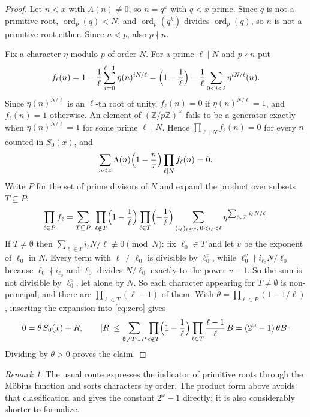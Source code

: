 \documentclass[11pt]{amsart}
\theoremstyle{definition}
\theoremstyle{remark}
\newtheorem{remark}[theorem]{Remark}
\newcommand{\Lam}{\Lambda}
\newcommand{\ord}{\operatorname{ord}}
\begin{document}
\begin{proof}
Let $n<x$ with $\Lam(n)\ne 0$, so $n=q^k$ with $q<x$ prime. Since $q$ is not a primitive root, $\ord_p(q)<N$, and $\ord_p(q^k)$ divides $\ord_p(q)$, so $n$ is not a primitive root either. Since $n<p$, also $p\nmid n$.

Fix a character $\eta$ modulo $p$ of order $N$. For a prime $\ell\mid N$ and $p\nmid n$ put
\[
f_\ell(n)=1-\frac1\ell\sum_{i=0}^{\ell-1}\eta(n)^{iN/\ell}=\Bigl(1-\frac1\ell\Bigr)-\frac1\ell\sum_{0<i<\ell}\eta^{iN/\ell}(n).
\]
Since $\eta(n)^{N/\ell}$ is an $\ell$-th root of unity, $f_\ell(n)=0$ if $\eta(n)^{N/\ell}=1$, and $f_\ell(n)=1$ otherwise. An element of $(\mathbb{Z}/p\mathbb{Z})^\times$ fails to be a generator exactly when $\eta(n)^{N/\ell}=1$ for some prime $\ell\mid N$. Hence $\prod_{\ell\mid N}f_\ell(n)=0$ for every $n$ counted in $S_0(x)$, and
\begin{equation}\label{eq:zero}
\sum_{n<x}\Lam(n)\Bigl(1-\frac nx\Bigr)\prod_{\ell\mid N}f_\ell(n)=0 .
\end{equation}
Write $P$ for the set of prime divisors of $N$ and expand the product over subsets $T\subseteq P$:
\[
\prod_{\ell\in P}f_\ell=\sum_{T\subseteq P}\ \prod_{\ell\notin T}\Bigl(1-\frac1\ell\Bigr)\prod_{\ell\in T}\Bigl(-\frac1\ell\Bigr)\sum_{(i_\ell)_{\ell\in T},\,0<i_\ell<\ell}\eta^{\sum_{\ell\in T} i_\ell N/\ell}.
\]
If $T\neq\emptyset$ then $\sum_{\ell\in T}i_\ell N/\ell\not\equiv 0\pmod N$: fix $\ell_0\in T$ and let $v$ be the exponent of $\ell_0$ in $N$. Every term with $\ell\ne\ell_0$ is divisible by $\ell_0^{v}$, while $\ell_0^{v}\nmid i_{\ell_0}N/\ell_0$ because $\ell_0\nmid i_{\ell_0}$ and $\ell_0$ divides $N/\ell_0$ exactly to the power $v-1$. So the sum is not divisible by $\ell_0^{v}$, let alone by $N$. So each character appearing for $T\ne\emptyset$ is non-principal, and there are $\prod_{\ell\in T}(\ell-1)$ of them. With $\theta=\prod_{\ell\in P}(1-1/\ell)$, inserting the expansion into \eqref{eq:zero} gives
\[
0=\theta\,S_0(x)+R,\qquad |R|\le\sum_{\emptyset\ne T\subseteq P}\prod_{\ell\notin T}\Bigl(1-\frac1\ell\Bigr)\prod_{\ell\in T}\frac{\ell-1}{\ell}\,B=(2^\omega-1)\,\theta B .
\]
Dividing by $\theta>0$ proves the claim.
\end{proof}

\begin{remark}
The usual route expresses the indicator of primitive roots through the M\"obius function and sorts characters by order. The product form above avoids that classification and gives the constant $2^\omega-1$ directly; it is also considerably shorter to formalize.
\end{remark}
\end{document}
